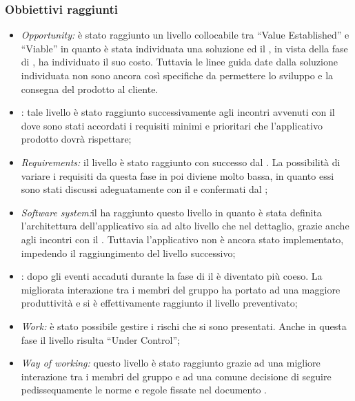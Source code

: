 \subsubsection{Obbiettivi raggiunti}
\begin{itemize}
\item \textit{Opportunity:} è stato raggiunto un livello collocabile tra ``Value Established'' e ``Viable'' in quanto è stata individuata una soluzione ed il , in vista della fase di \fC, ha individuato il suo costo. Tuttavia le linee guida date dalla soluzione individuata non sono ancora così specifiche da permettere lo sviluppo e la consegna del prodotto al cliente.
\item {}:  tale livello è stato raggiunto successivamente agli incontri avvenuti con il  dove sono stati accordati i requisiti minimi e prioritari che l'applicativo prodotto dovrà rispettare;
\item \textit{Requirements:}  il livello è stato raggiunto con successo dal . La possibilità di variare i requisiti da questa fase in poi diviene molto bassa, in quanto essi sono stati discussi adeguatamente con il  e confermati dal ;
\item \textit{Software system:}il  ha raggiunto questo livello in quanto è stata definita l'architettura dell'applicativo sia ad alto livello che nel dettaglio, grazie anche agli incontri con il . Tuttavia l'applicativo non è ancora stato implementato, impedendo il raggiungimento del livello successivo;
\item {}: dopo gli eventi accaduti durante la fase di \fPA il  è diventato più coeso. La migliorata interazione tra i membri del gruppo ha portato ad una maggiore produttività e si è effettivamente raggiunto il livello preventivato;
\item \textit{Work:} è stato possibile gestire i rischi che si sono presentati. Anche in questa fase il livello risulta ``Under Control'';
\item \textit{Way of working:} questo livello è stato raggiunto grazie ad una migliore interazione tra i membri del gruppo e ad una comune decisione di seguire pedissequamente le norme e regole fissate nel documento \NP.
\end{itemize}
\subsection{\fCt}\label{resocontoSEMAT3}
